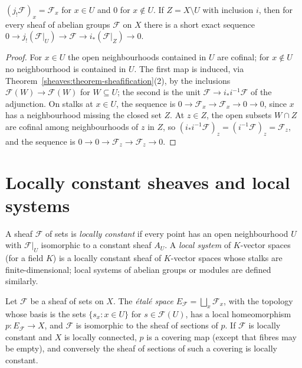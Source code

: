 \begin{proposition}\label{sheaves:proposition-extension-by-zero}
$(j_!\mathcal{F})_x = \mathcal{F}_x$ for $x \in U$ and $0$ for $x \notin U$. If $Z = X \setminus U$ with inclusion $i$, then for every sheaf of abelian groups $\mathcal{F}$ on $X$ there is a
short exact sequence $0 \to j_!(\mathcal{F}|_U) \to \mathcal{F} \to i_*(\mathcal{F}|_Z) \to 0$.
\end{proposition}

\begin{proof}
For $x \in U$ the open neighbourhoods contained in $U$ are cofinal; for $x \notin U$ no neighbourhood is contained in $U$. The first map is induced, via
Theorem~\ref{sheaves:theorem-sheafification}(2), by the inclusions $\mathcal{F}(W) \to \mathcal{F}(W)$ for $W \subseteq U$; the second is the unit
$\mathcal{F} \to i_*i^{-1}\mathcal{F}$ of the adjunction. On stalks at $x \in U$, the sequence is $0 \to \mathcal{F}_x \to \mathcal{F}_x \to 0 \to 0$, since $x$ has a neighbourhood missing the
closed set $Z$. At $z \in Z$, the open subsets $W \cap Z$ are cofinal among neighbourhoods of $z$ in $Z$, so $(i_*i^{-1}\mathcal{F})_z = (i^{-1}\mathcal{F})_z = \mathcal{F}_z$, and the
sequence is $0 \to 0 \to \mathcal{F}_z \to \mathcal{F}_z \to 0$.
\end{proof}

\section{Locally constant sheaves and local systems}\label{sheaves:section-local-systems}

\begin{definition}\label{sheaves:definition-local-system}
A sheaf $\mathcal{F}$ of sets is \emph{locally constant} if every point has an open neighbourhood $U$ with $\mathcal{F}|_U$ isomorphic to a constant sheaf $A_U$. A \emph{local system}
of $K$-vector spaces (for a field $K$) is a locally constant sheaf of $K$-vector spaces whose stalks are finite-dimensional; local systems of abelian groups or modules are defined
similarly.
\end{definition}

\begin{proposition}\label{sheaves:proposition-etale-space}
Let $\mathcal{F}$ be a sheaf of sets on $X$. The \emph{\'etal\'e space} $E_\mathcal{F} = \bigsqcup_x\mathcal{F}_x$, with the topology whose basis is the sets $\{s_x : x \in U\}$ for
$s \in \mathcal{F}(U)$, has a local homeomorphism $p \colon E_\mathcal{F} \to X$, and $\mathcal{F}$ is isomorphic to the sheaf of sections of $p$. If $\mathcal{F}$ is locally constant and $X$
is locally connected, $p$ is a covering map (except that fibres may be empty), and conversely the sheaf of sections of such a covering is locally constant.
\end{proposition}

